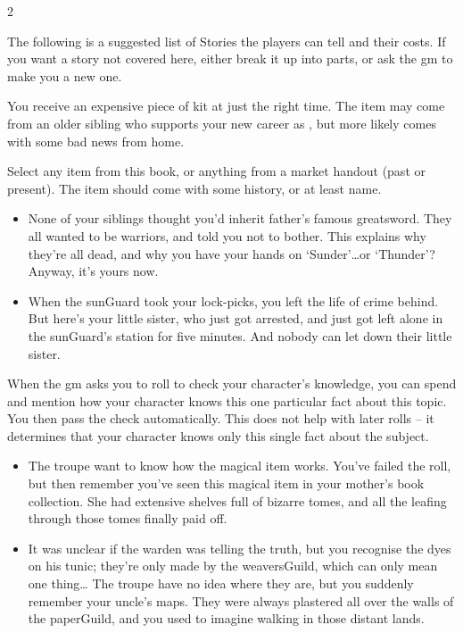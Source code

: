 \begin{multicols}{2}

\noindent
The following is a suggested list of Stories the players can tell and their costs.
If you want a story not covered here, either break it up into parts, or ask the \gls{gm} to make you a new one.

You receive an expensive piece of kit at just the right time.
The item may come from an older sibling who supports your new career as , but more likely comes with some bad news from home.

Select any item from this book, or anything from a market handout (past or present).
The item should come with some history, or at least name.

\begin{exampletext}
  \begin{itemize}
    \item
    None of your siblings thought you'd inherit father's famous greatsword.
    They all wanted to be warriors, and told you not to bother.
    This explains why they're all dead, and why you have your hands on `Sunder'\ldots or `Thunder'?
    Anyway, it's yours now.
    \item
    When the \gls{sunGuard} took your lock-picks, you left the life of crime behind.
    But here's your little sister, who just got arrested, and just got left alone in the \gls{sunGuard}'s station for five minutes.
    And nobody can let down their little sister.
  \end{itemize}
\end{exampletext}

\label{randomFact}
When the \gls{gm} asks you to roll to check your character's knowledge, you can spend  and mention how your character knows this one particular fact about this topic.
You then pass the check automatically.
This does not help with later rolls -- it determines that your character knows only this single fact about the subject.

\begin{exampletext}
  \begin{itemize}
    \item
    The troupe want to know how the magical item works.
    You've failed the roll, but then remember you've seen this magical item in your mother's book collection.
    She had extensive shelves full of bizarre tomes, and all the leafing through those tomes finally paid off.
    \item\ifodd\thecycle%
      It was unclear if the \gls{warden} was telling the truth, but you recognise the dyes on his tunic; they're only made by the \gls{weaversGuild}, which can only mean one thing\ldots
    \else%
      The troupe have no idea where they are, but you suddenly remember your uncle's maps.
      They were always plastered all over the walls of the \gls{paperGuild}, and you used to imagine walking in those distant lands.
    \fi%
  \end{itemize}
\end{exampletext}


\end{multicols}
